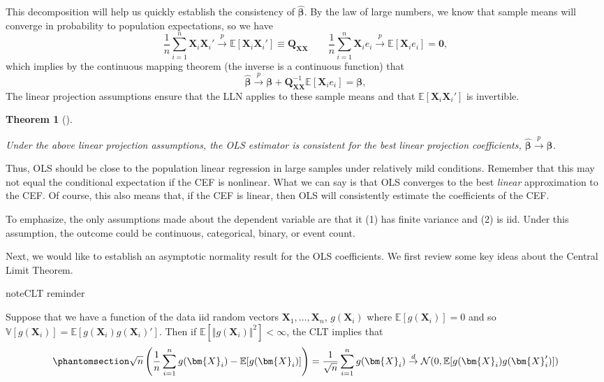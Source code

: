 \documentclass[
  13pt,
  letterpaper,
  DIV=11,
  numbers=noendperiod]{scrreprt}
\newcommand{\mb}{\bm}
\newcommand{\E}{\mathbb{E}}
\newcommand{\V}{\mathbb{V}}
\newcommand{\N}{\mathcal{N}}
\newcommand{\X}{\mb{X}}
\newcommand{\bfbeta}{\mb{\beta}}
\newcommand{\bhat}{\widehat{\mb{\beta}}}
\newcommand{\inprob}{\overset{p}{\to}}
\newcommand{\indist}{\overset{d}{\to}}
\theoremstyle{plain}
\newtheorem{theorem}{Theorem}[chapter]
\theoremstyle{plain}
\theoremstyle{definition}
\theoremstyle{definition}
\theoremstyle{remark}
\begin{document}
This decomposition will help us quickly establish the consistency of
\(\bhat\). By the law of large numbers, we know that sample means will
converge in probability to population expectations, so we have \[ 
\frac{1}{n} \sum_{i=1}^n \X_i\X_i' \inprob \E[\X_i\X_i'] \equiv \mb{Q}_{\X\X} \qquad \frac{1}{n} \sum_{i=1}^n \X_ie_i \inprob \E[\X_{i} e_{i}] = \mb{0},
\] which implies by the continuous mapping theorem (the inverse is a
continuous function) that \[
\bhat \inprob \bfbeta + \mb{Q}_{\X\X}^{-1}\E[\X_ie_i] = \bfbeta,
\] The linear projection assumptions ensure that the LLN applies to
these sample means and that \(\E[\X_{i}\X_{i}']\) is invertible.

\begin{theorem}[]\protect\hypertarget{thm-ols-consistency}{}\label{thm-ols-consistency}

Under the above linear projection assumptions, the OLS estimator is
consistent for the best linear projection coefficients,
\(\bhat \inprob \bfbeta\).

\end{theorem}

Thus, OLS should be close to the population linear regression in large
samples under relatively mild conditions. Remember that this may not
equal the conditional expectation if the CEF is nonlinear. What we can
say is that OLS converges to the best \emph{linear} approximation to the
CEF. Of course, this also means that, if the CEF is linear, then OLS
will consistently estimate the coefficients of the CEF.

To emphasize, the only assumptions made about the dependent variable are
that it (1) has finite variance and (2) is iid. Under this assumption,
the outcome could be continuous, categorical, binary, or event count.

Next, we would like to establish an asymptotic normality result for the
OLS coefficients. We first review some key ideas about the Central Limit
Theorem.

\begin{bookcallout}{note}{CLT reminder}

Suppose that we have a function of the data iid random vectors
\(\X_1, \ldots, \X_n\), \(g(\X_{i})\) where \(\E[g(\X_{i})] = 0\) and so
\(\V[g(\X_{i})] = \E[g(\X_{i})g(\X_{i})']\). Then if
\(\E[\Vert g(\X_{i})\Vert^{2}] < \infty\), the CLT implies that
\begin{equation}\protect\phantomsection\label{eq-clt-mean-zero}{ 
\sqrt{n}\left(\frac{1}{n} \sum_{i=1}^{n} g(\X_{i}) - \E[g(\X_{i})]\right) = \frac{1}{\sqrt{n}} \sum_{i=1}^{n} g(\X_{i}) \indist \N(0, \E[g(\X_{i})g(\X_{i}')]) 
}\end{equation}

\end{bookcallout}
\end{document}
